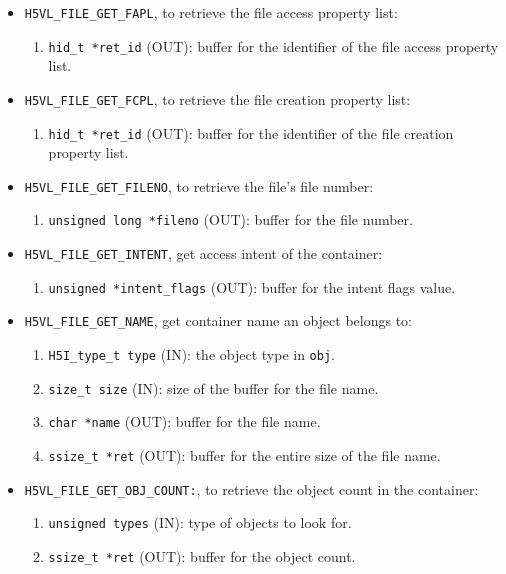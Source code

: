 \begin{mdframed}[style=bgbox]
\begin{itemize}
\item \texttt{H5VL\_FILE\_GET\_FAPL}, to retrieve the file access
  property list:
  \begin{enumerate}
  \item \texttt{hid\_t *ret\_id} (OUT): buffer for the identifier of the
    file access property list.
  \end{enumerate}

\item \texttt{H5VL\_FILE\_GET\_FCPL}, to retrieve the file creation
  property list:
  \begin{enumerate}
  \item \texttt{hid\_t *ret\_id} (OUT): buffer for the identifier of the
    file creation property list.
  \end{enumerate}

\item \texttt{H5VL\_FILE\_GET\_FILENO}, to retrieve the file's file number:
  \begin{enumerate}
  \item \texttt{unsigned long *fileno} (OUT): buffer for the file number.
  \end{enumerate}

\item \texttt{H5VL\_FILE\_GET\_INTENT}, get access intent of the
  container:
  \begin{enumerate}
  \item \texttt{unsigned *intent\_flags} (OUT): buffer for the intent flags value.
  \end{enumerate}

\item \texttt{H5VL\_FILE\_GET\_NAME}, get container name an object
  belongs to:
  \begin{enumerate}
  \item \texttt{H5I\_type\_t type} (IN): the object type in \texttt{obj}.
  \item \texttt{size\_t size} (IN): size of the buffer for the file name.
  \item \texttt{char *name} (OUT): buffer for the file name.
  \item \texttt{ssize\_t *ret} (OUT): buffer for the entire size of the
    file name.
  \end{enumerate}

\item \texttt{H5VL\_FILE\_GET\_OBJ\_COUNT:}, to retrieve the object count
  in the container:
  \begin{enumerate}
  \item \texttt{unsigned types} (IN): type of objects to look for.
  \item \texttt{ssize\_t *ret} (OUT): buffer for the object count.
  \end{enumerate}


\end{itemize}
\end{mdframed}

